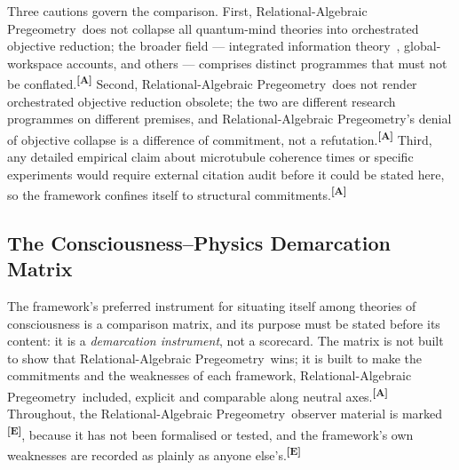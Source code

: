 \documentclass[12pt,a4paper,twoside]{article}
\theoremstyle{plain}
\theoremstyle{definition}
\theoremstyle{remark}
\newcommand{\ProjectShort}{Relational-Algebraic Pregeometry}
\newcommand{\RAP}{\ProjectShort}
\newcommand{\catmark}[1]{\textsuperscript{\textsf{\textbf{[#1]}}}}
\begin{document}
Three cautions govern the comparison. First, \RAP\ does not collapse all
quantum-mind theories into orchestrated objective reduction; the broader
field --- integrated information theory~\cite{tononi2004}, global-workspace
accounts, and others --- comprises distinct programmes that must not be
conflated.\catmark{A} Second, \RAP\ does not render orchestrated objective
reduction obsolete; the two are different research programmes on different
premises, and \RAP's denial of objective collapse is a difference of
commitment, not a refutation.\catmark{A} Third, any detailed empirical
claim about microtubule coherence times or specific experiments would
require external citation audit before it could be stated here, so the
framework confines itself to structural commitments.\catmark{A}

\subsection{The Consciousness--Physics Demarcation Matrix}
\label{subsec:demarcation-matrix}

The framework's preferred instrument for situating itself among theories of
consciousness is a comparison matrix, and its purpose must be stated before
its content: it is a \emph{demarcation instrument}, not a scorecard. The
matrix is not built to show that \RAP\ wins; it is built to make the
commitments and the weaknesses of each framework, \RAP\ included, explicit
and comparable along neutral axes.\catmark{A} Throughout, the \RAP\
observer material is marked \catmark{E}, because it has not been formalised
or tested, and the framework's own weaknesses are recorded as plainly as
anyone else's.\catmark{E}
\end{document}
